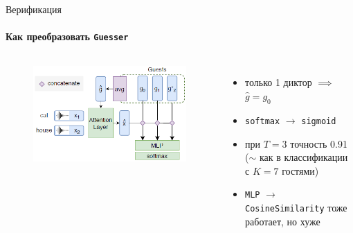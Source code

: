 \documentclass[aspectratio=169]{beamer}
\newcommand{\guesser}{\texttt{Guesser}}
\begin{document}
\begin{frame}{Верификация}
    \framesubtitle{Как преобразовать \guesser}

    \begin{columns}
        \begin{figure}[bht]
        \includegraphics[width=.8\textwidth]{guesser.png}
        \end{figure}

        \begin{itemize}
            \item только 1 диктор $\implies$ $\hat{g} = g_0$
            \item \texttt{softmax} $\rightarrow$ \texttt{sigmoid} 
            \item при $T = 3$ точность 0.91\\($\sim$ как в классификации с
                  $K = 7$ гостями)
            \item \texttt{MLP} $\rightarrow$ \texttt{CosineSimilarity} тоже
                  работает, но хуже
        \end{itemize}
    \end{columns}
\end{frame}
\end{document}
